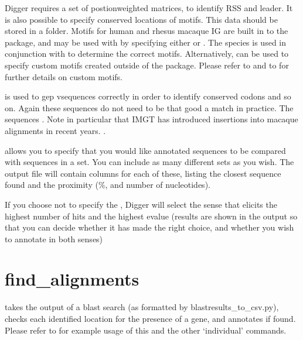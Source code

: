 \documentclass[letterpaper,10pt,english]{sphinxmanual}
\begin{document}
\sphinxAtStartPar
Digger requires a set of postion\sphinxhyphen{}weighted matrices, to identify RSS and leader. It is also possible to specify conserved locations of motifs. This  data should be stored in a  folder. Motifs for
human and rhesus macaque IG are built in to the package, and may be used with  by specifying either  or . The species is used in conjunction with  to determine
the correct motifs. Alternatively,  can be used to specify custom motifs created outside of the package. Please refer to {\hyperref[\detokenize{tools/calc_motifs:calc-motifs}]{}} and to  for further details
on custom motifs.

\sphinxAtStartPar
{} is used to gep v\sphinxhyphen{}sequences correctly in order to identify conserved codons and so on. Again these sequences do not need to be that good a match in practice. The sequences . Note in particular that IMGT has introduced insertions into macaque alignments in recent years. .

\sphinxAtStartPar
{} allows you to specify that you would like annotated sequences to be compared with sequences in a set. You can include as many different sets as you wish. The output file will contain columns
for each of these, listing the closest sequence found and the proximity (\%, and number of nucleotides).

\sphinxAtStartPar
If you choose not to specify the , Digger will select the sense that elicits the highest number of hits and the highest evalue (results are shown in the output so that you can decide whether it has made the right choice,
and whether you wish to annotate in both senses)

\sphinxstepscope


\section{find\_alignments}
\label{\detokenize{tools/find_alignments:find-alignments}}\label{\detokenize{tools/find_alignments:id1}}\label{\detokenize{tools/find_alignments::doc}}
\sphinxAtStartPar
{} takes the output of a blast search (as formatted by blastresults\_to\_csv.py), checks each identified location for the presence of a gene, and annotates if found.
Please refer to  for example usage of this and the other ‘individual’ commands.
\end{document}
